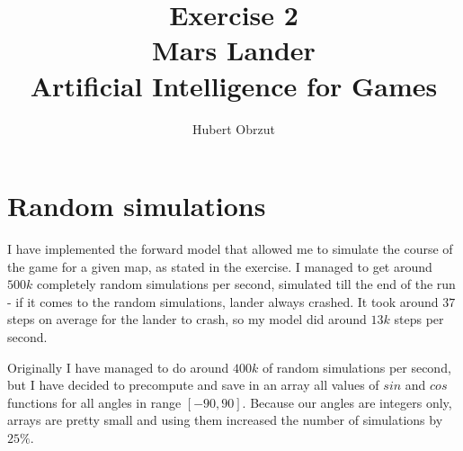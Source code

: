 \documentclass[11pt]{article}
\title{
	Exercise 2 \\
	Mars Lander \\
	Artificial Intelligence for Games \\
}
\author{Hubert Obrzut}
\begin{document}
	\maketitle
	
	\section{Random simulations}
 	I have implemented the forward model that allowed me to simulate the course of the game for a given map, as stated in the exercise. I managed to get around $500k$ completely random simulations per second, simulated till the end of the run - if it comes to the random simulations, lander always crashed. It took around $37$ steps on average for the lander to crash, so my model did around $13k$ steps per second.
 	
 	Originally I have managed to do around $400k$ of random simulations per second, but I have decided to precompute and save in an array all values of $sin$ and $cos$ functions for all angles in range $[-90, 90]$. Because our angles are integers only, arrays are pretty small and using them increased the number of simulations by $25\%$.
	
\end{document}
